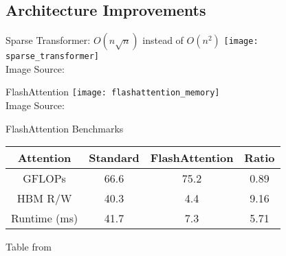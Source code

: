 \subsection{Architecture Improvements}
\begin{frame}[c]{Sparse Transformer: $O(n \sqrt{n})$ instead of $O(n^2)$}
    \texttt{[image: sparse\_transformer]} \\
    \normalsize
    Image Source: \cite{child_generating_2019}
\end{frame}


\begin{frame}[c]{FlashAttention}
    \texttt{[image: flashattention\_memory]} \\
    Image Source: \cite{dao_flashattention_2022}
\end{frame}


\begin{frame}[c]{FlashAttention Benchmarks}
    \large
    \begin{tabular}{c|ccc}
        Attention & Standard & FlashAttention & Ratio \\ \hline
        GFLOPs & 66.6  & 75.2 & 0.89 \\
        HBM R/W & 40.3 & 4.4 & 9.16 \\
        Runtime (ms) & 41.7 & 7.3 & 5.71 \\
    \end{tabular} \newline \newline
    \normalsize
    Table from \cite{dao_flashattention_2022}
\end{frame}



